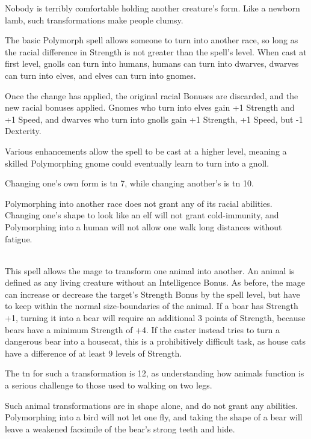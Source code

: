 \begin{multicols}{2}
Nobody is terribly comfortable holding another creature's form.  Like a newborn lamb, such transformations make people clumsy.

\spelllevel



The basic Polymorph spell allows someone to turn into another race, so long as the racial difference in Strength is not greater than the spell's level.
When cast at first level, gnolls can turn into humans, humans can turn into dwarves, dwarves can turn into elves, and elves can turn into gnomes.

Once the change has applied, the original racial Bonuses are discarded, and the new racial bonuses applied.
Gnomes who turn into elves gain +1 Strength and +1 Speed, and dwarves who turn into gnolls gain +1 Strength, +1 Speed, but -1 Dexterity.

Various enhancements allow the spell to be cast at a higher level, meaning a skilled Polymorphing gnome could eventually learn to turn into a gnoll.

Changing one's own form is \gls{tn} 7, while changing another's is \gls{tn} 10.

Polymorphing into another race does not grant any of its racial abilities.
Changing one's shape to look like an elf will not grant cold-immunity, and Polymorphing into a human will not allow one walk long distances without fatigue.

\\
This spell allows the mage to transform one animal into another.
An animal is defined as any living creature without an Intelligence Bonus.
As before, the mage can increase or decrease the target's Strength Bonus by the spell level,
but have to keep within the normal size-boundaries of the animal.
If a boar has Strength +1, turning it into a bear will require an additional 3 points of Strength, because bears have a minimum Strength of +4.
If the caster instead tries to turn a dangerous bear into a housecat, this is a prohibitively difficult task, as house cats have a difference of at least 9 levels of Strength.

The \gls{tn} for such a transformation is 12, as understanding how animals function is a serious challenge to those used to walking on two legs.

Such animal transformations are in shape alone, and do not grant any abilities.  Polymorphing into a bird will not let one fly, and taking the shape of a bear will leave a weakened facsimile of the bear's strong teeth and hide.


\end{multicols}
